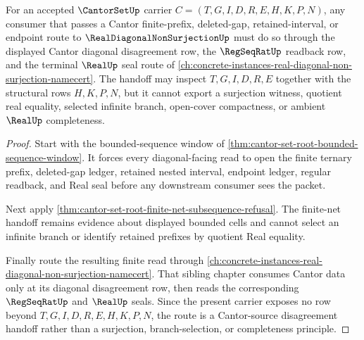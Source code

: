 \begin{theorem}
\label{thm:real-diagonal-non-surjection-cantor-route}
For an accepted $\CantorSetUp$ carrier $C=(T,G,I,D,R,E,H,K,P,N)$, any consumer that passes a Cantor finite-prefix, deleted-gap, retained-interval, or endpoint route to $\RealDiagonalNonSurjectionUp$ must do so through the displayed Cantor diagonal disagreement row, the $\RegSeqRatUp$ readback row, and the terminal $\RealUp$ seal route of \autoref{ch:concrete-instances-real-diagonal-non-surjection-namecert}. The handoff may inspect $T,G,I,D,R,E$ together with the structural rows $H,K,P,N$, but it cannot export a surjection witness, quotient real equality, selected infinite branch, open-cover compactness, or ambient $\RealUp$ completeness.
\end{theorem}
\begin{proof}
Start with the bounded-sequence window of \autoref{thm:cantor-set-root-bounded-sequence-window}. It forces every diagonal-facing read to open the finite ternary prefix, deleted-gap ledger, retained nested interval, endpoint ledger, regular readback, and Real seal before any downstream consumer sees the packet.

Next apply \autoref{thm:cantor-set-root-finite-net-subsequence-refusal}. The finite-net handoff remains evidence about displayed bounded cells and cannot select an infinite branch or identify retained prefixes by quotient Real equality.

Finally route the resulting finite read through \autoref{ch:concrete-instances-real-diagonal-non-surjection-namecert}. That sibling chapter consumes Cantor data only at its diagonal disagreement row, then reads the corresponding $\RegSeqRatUp$ and $\RealUp$ seals. Since the present carrier exposes no row beyond $T,G,I,D,R,E,H,K,P,N$, the route is a Cantor-source disagreement handoff rather than a surjection, branch-selection, or completeness principle.
\end{proof}

